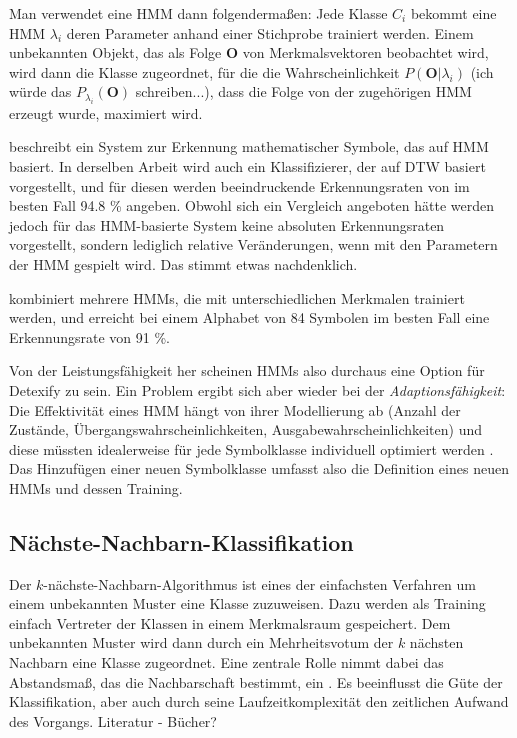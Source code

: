 Man verwendet eine HMM dann folgendermaßen: Jede Klasse $C_i$ bekommt eine HMM $\lambda_i$ deren Parameter anhand einer Stichprobe trainiert werden. Einem unbekannten Objekt, das als Folge $\mathbf{O}$ von Merkmalsvektoren beobachtet wird, wird dann die Klasse zugeordnet, für die die Wahrscheinlichkeit $P(\mathbf{O}|\lambda_i)$ (\TODO ich würde das $P_{\lambda_i}(\mathbf{O})$ schreiben...), dass die Folge von der zugehörigen HMM erzeugt wurde, maximiert wird.

\citet{Xie:2007p11427} beschreibt ein System zur Erkennung mathematischer Symbole, das auf HMM basiert. In derselben Arbeit wird auch ein Klassifizierer, der auf DTW basiert vorgestellt, und für diesen werden beeindruckende Erkennungsraten von im besten Fall 94.8 \% angeben. Obwohl sich ein Vergleich angeboten hätte werden jedoch für das HMM-basierte System keine absoluten Erkennungsraten vorgestellt, sondern lediglich relative Veränderungen, wenn mit den Parametern der HMM gespielt wird. Das stimmt etwas nachdenklich.

\citet{Winkler:1996p11716} kombiniert mehrere HMMs, die mit unterschiedlichen Merkmalen trainiert werden, und erreicht bei einem Alphabet von 84 Symbolen im besten Fall eine Erkennungsrate von 91 \%.

Von der Leistungsfähigkeit her scheinen HMMs also durchaus eine Option für Detexify zu sein. Ein Problem ergibt sich aber wieder bei der \emph{Adaptionsfähigkeit}: Die Effektivität eines HMM hängt von ihrer Modellierung ab (Anzahl der Zustände, Übergangswahrscheinlichkeiten, Ausgabewahrscheinlichkeiten) und diese müssten idealerweise für jede Symbolklasse individuell optimiert werden \cite{Fitzgerald:2005p331}. Das Hinzufügen einer neuen Symbolklasse umfasst also die Definition eines neuen HMMs und dessen Training.

\subsection{Nächste-Nachbarn-Klassifikation} \label{sub:knn}

Der $k$-nächste-Nachbarn-Algorithmus ist eines der einfachsten Verfahren um einem unbekannten Muster eine Klasse zuzuweisen. Dazu werden als Training einfach Vertreter der Klassen in einem Merkmalsraum gespeichert. Dem unbekannten Muster wird dann durch ein Mehrheitsvotum der $k$ nächsten Nachbarn eine Klasse zugeordnet. Eine zentrale Rolle nimmt dabei das Abstandsmaß, das die Nachbarschaft bestimmt, ein \cite{Jaeger:2003p1097}. Es beeinflusst die Güte der Klassifikation, aber auch durch seine Laufzeitkomplexität den zeitlichen Aufwand des Vorgangs. \TODO Literatur - Bücher?

